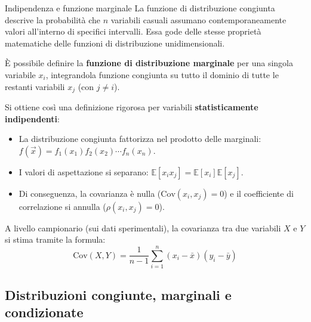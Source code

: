 \documentclass[openany,a4paper,12pt]{book}
\theoremstyle{remark}
\begin{document}
\begin{bressan}{Indipendenza e funzione marginale}
La funzione di distribuzione congiunta descrive la probabilità che $n$ variabili casuali assumano contemporaneamente valori all'interno di specifici intervalli. Essa gode delle stesse proprietà matematiche delle funzioni di distribuzione unidimensionali. 

È possibile definire la \textbf{funzione di distribuzione marginale} per una singola variabile $x_i$, integrandola funzione congiunta su tutto il dominio di tutte le restanti variabili $x_j$ (con $j \neq i$).

Si ottiene così una definizione rigorosa per variabili \textbf{statisticamente indipendenti}:
\begin{itemize}
    \item La distribuzione congiunta fattorizza nel prodotto delle marginali: $f(\vec{x}) = f_1(x_1)f_2(x_2)\cdots f_n(x_n)$.
    \item I valori di aspettazione si separano: $\mathbb{E}[x_i x_j] = \mathbb{E}[x_i]\mathbb{E}[x_j]$.
    \item Di conseguenza, la covarianza è nulla ($\text{Cov}(x_i,x_j) = 0$) e il coefficiente di correlazione si annulla ($\rho(x_i,x_j) = 0$).
\end{itemize}

A livello campionario (sui dati sperimentali), la covarianza tra due variabili $X$ e $Y$ si stima tramite la formula:
\begin{equation}
    \text{Cov}(X, Y) = \frac{1}{n - 1} \sum_{i=1}^{n} (x_i - \bar{x})(y_i - \bar{y})
\end{equation}
\end{bressan}

\subsection{Distribuzioni congiunte, marginali e condizionate}
\end{document}
